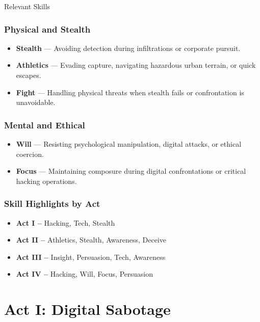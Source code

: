 \documentclass[nodeprecatedcode,bg=print]{dndbook}
\begin{document}
\begin{multicols}{2}
\begin{CommentBox}{Relevant Skills}
    \subsubsection*{Physical and Stealth}
    \begin{itemize}
        \item \textbf{Stealth} — Avoiding detection during infiltrations or corporate pursuit.
        \item \textbf{Athletics} — Evading capture, navigating hazardous urban terrain, or quick escapes.
        \item \textbf{Fight} — Handling physical threats when stealth fails or confrontation is unavoidable.
    \end{itemize}

    \subsubsection*{Mental and Ethical}
    \begin{itemize}
        \item \textbf{Will} — Resisting psychological manipulation, digital attacks, or ethical coercion.
        \item \textbf{Focus} — Maintaining composure during digital confrontations or critical hacking operations.
    \end{itemize}

    \subsubsection*{Skill Highlights by Act}
    \begin{itemize}
        \item \textbf{Act I –} Hacking, Tech, Stealth
        \item \textbf{Act II –} Athletics, Stealth, Awareness, Deceive
        \item \textbf{Act III –} Insight, Persuasion, Tech, Awareness
        \item \textbf{Act IV –} Hacking, Will, Focus, Persuasion
    \end{itemize}    
\end{CommentBox}



\section*{Act I: Digital Sabotage}


\end{multicols}
\end{document}

